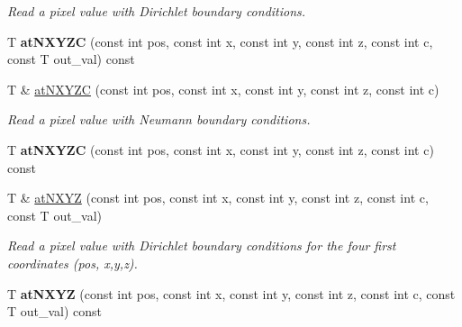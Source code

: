\begin{DoxyCompactItemize}
\begin{DoxyCompactList}\small\item\em Read a pixel value with Dirichlet boundary conditions. \item\end{DoxyCompactList}\item 
\hypertarget{structcimg__library_1_1CImgList_a9ceb88fd2ac3fda139fcdf0b259e81ec}{
T {\bfseries atNXYZC} (const int pos, const int x, const int y, const int z, const int c, const T out\_\-val) const }
\label{structcimg__library_1_1CImgList_a9ceb88fd2ac3fda139fcdf0b259e81ec}

\item 
\hypertarget{structcimg__library_1_1CImgList_ab339e637cf6f9c97609b4529fd0d12ea}{
T \& \hyperlink{structcimg__library_1_1CImgList_ab339e637cf6f9c97609b4529fd0d12ea}{atNXYZC} (const int pos, const int x, const int y, const int z, const int c)}
\label{structcimg__library_1_1CImgList_ab339e637cf6f9c97609b4529fd0d12ea}

\begin{DoxyCompactList}\small\item\em Read a pixel value with Neumann boundary conditions. \item\end{DoxyCompactList}\item 
\hypertarget{structcimg__library_1_1CImgList_a6053193bf4f73812f33ab0fb373792a0}{
T {\bfseries atNXYZC} (const int pos, const int x, const int y, const int z, const int c) const }
\label{structcimg__library_1_1CImgList_a6053193bf4f73812f33ab0fb373792a0}

\item 
\hypertarget{structcimg__library_1_1CImgList_abb901e9006a419f654a572903bdc6cd0}{
T \& \hyperlink{structcimg__library_1_1CImgList_abb901e9006a419f654a572903bdc6cd0}{atNXYZ} (const int pos, const int x, const int y, const int z, const int c, const T out\_\-val)}
\label{structcimg__library_1_1CImgList_abb901e9006a419f654a572903bdc6cd0}

\begin{DoxyCompactList}\small\item\em Read a pixel value with Dirichlet boundary conditions for the four first coordinates ({\ttfamily pos}, {\ttfamily x},{\ttfamily y},{\ttfamily z}). \item\end{DoxyCompactList}\item 
\hypertarget{structcimg__library_1_1CImgList_a7af13e9853ed0daa85837eef7e4660af}{
T {\bfseries atNXYZ} (const int pos, const int x, const int y, const int z, const int c, const T out\_\-val) const }
\label{structcimg__library_1_1CImgList_a7af13e9853ed0daa85837eef7e4660af}


\end{DoxyCompactItemize}
